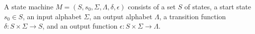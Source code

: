 A state machine $M = (S, s_0, \Sigma, \Lambda, \delta, \epsilon)$ consists of
  a set $S$ of states,
  a start state $s_0 \in S$,
  an input alphabet $\Sigma$,
  an output alphabet $\Lambda$,
  a transition function $\delta: S \times \Sigma \to S$, and
  an output function $\epsilon: S \times \Sigma \to \Lambda$.


